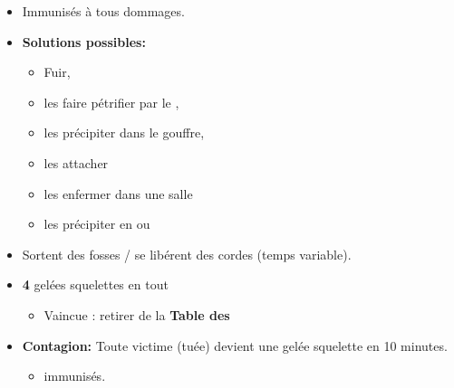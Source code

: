 \begin{itemize}
  \item Immunisés à tous dommages.
  \item \textbf{Solutions possibles:}
  \begin{itemize}
    \item Fuir,
    \item les faire pétrifier par le \textbf{},
    \item les précipiter dans le gouffre,
    \item les attacher
    \item les enfermer dans une salle
    \item les précipiter en \textbf{} ou \textbf{}
  \end{itemize}
  \item Sortent des fosses / se libérent des cordes (temps variable).
  \item \textbf{4} gelées squelettes en tout
  \begin{itemize}
    \item Vaincue : retirer de la \textbf{Table des }
  \end{itemize}
  \item \textbf{Contagion:} Toute victime (tuée) devient une gelée squelette en 10 minutes.
  \begin{itemize}
    \item \textbf{} immunisés.
  \end{itemize}
\end{itemize}


\vfill


